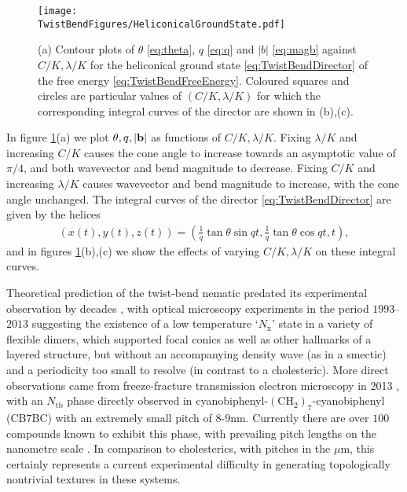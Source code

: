 \begin{figure}[htbp]
    \centering
    \texttt{[image: \\TwistBendFigures/HeliconicalGroundState.pdf]}
    \caption{(a) Contour plots of $\theta$ \eqref{eq:theta}, $q$ \eqref{eq:q} and $|b|$ \eqref{eq:magb} against $C/K, \lambda/K$ for the heliconical ground state \eqref{eq:TwistBendDirector} of the free energy \eqref{eq:TwistBendFreeEnergy}. Coloured squares and circles are particular values of $(C/K, \lambda /K)$ for which the corresponding integral curves of the director are shown in (b),(c).}
    \label{fig:HeliconicalGroundState}
\end{figure}
In figure \ref{fig:HeliconicalGroundState}(a) we plot $\theta, q, |\mathbf{b}|$ as functions of $C/K, \lambda/K$. Fixing $\lambda/K$ and increasing $C/K$ causes the cone angle to increase towards an asymptotic value of $\pi/4$, and both wavevector and bend magnitude to decrease. Fixing $C/K$ and increasing $\lambda/K$ causes wavevector and bend magnitude to increase, with the cone angle unchanged. The integral curves of the director \eqref{eq:TwistBendDirector} are given by the helices
\begin{align}
    (x(t),y(t),z(t)) = (\frac{1}{q} \tan \theta \sin qt, \frac{1}{q} \tan \theta \cos qt,t),
\end{align}
and in figures \ref{fig:HeliconicalGroundState}(b),(c) we show the effects of varying $C/K, \lambda/K$ on these integral curves.

Theoretical prediction of the twist-bend nematic predated its experimental observation by decades \citep{Lavrentovich2018}, with optical microscopy experiments in the period $1993$--$2013$ suggesting the existence of a low temperature `$N_\mathrm{x}$' state in a variety of flexible dimers, which supported focal conics as well as other hallmarks of a layered structure, but without an accompanying density wave (as in a smectic) and a periodicity too small to resolve (in contrast to a cholesteric). More direct observations came from freeze-fracture transmission electron microscopy in 2013 \citep{Borshch2013}, with an $N_{\mathrm{tb}}$ phase directly observed in cyanobiphenyl-$(\mathrm{CH}_2)_7$-cyanobiphenyl (CB$7$BC) with an extremely small pitch of $8$-$9$nm. Currently there are over $100$ compounds known to exhibit this phase, with prevailing pitch lengths on the nanometre scale \citep{Lavrentovich2018}. In comparison to cholesterics, with pitches in the $\mu$m, this certainly represents a current experimental difficulty in generating topologically nontrivial textures in these systems. 
\label{sec:GeometryTopologyOfBend}
